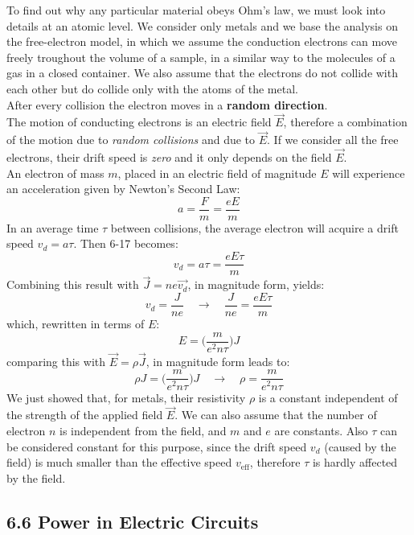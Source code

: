 \documentclass[12pt, a4paper]{article}
\begin{document}
		To find out why any particular material obeys Ohm's law, we must look into details at an atomic level. We consider only metals and we base the analysis on the free-electron model, in which we assume the conduction electrons can move freely troughout the volume of a sample, in a similar way to the molecules of a gas in a closed container. We also assume that the electrons do not collide with each other but do collide only with the atoms of the metal. \\
		After every collision the electron moves in a \textbf{random direction}. \\
		The motion of conducting electrons is an electric field $\vec{E}$, therefore a combination of the motion due to \textit{random collisions} and due to $\vec{E}$. If we consider all the free electrons, their drift speed is \textit{zero} and it only depends on the field $\vec{E}$.
		\\ 
		An electron of mass $m$, placed in an electric field of magnitude $E$ will experience an acceleration given by Newton's Second Law:
		\[
			a = \frac{F}{m} = \frac{eE}{m}
			\tag{6-17}
		\]
		In an average time $\tau$ between collisions, the average electron will acquire a drift speed $v_d = a \tau$. Then 6-17 becomes:
		\[
			v_d = a \tau = \frac{e E \tau}{m}
			\tag{6-18}			
		\]
		Combining this result with $\vec{J} = n e \vec{v_d}$, in magnitude form, yields:
		\[
			v_d = \frac{J}{n e} \quad \rightarrow \quad \frac{J}{n e} = \frac{e E \tau}{m}
			\tag{6-19}
		\]
		which, rewritten in terms of $E$:
		\[
			E = \biggl( \frac{m}{e^2 n \tau} \biggl) J
			\tag{6-20}
		\]
		comparing this with $\vec{E} = \rho \vec{J}$, in magnitude form leads to:
		\[
			\rho J = \biggl( \frac{m}{e^2 n \tau} \biggl) J \quad
			\rightarrow \quad \rho = \frac{m}{e^2 n \tau}
			\tag{6-21}
		\]
		We just showed that, for metals, their resistivity $\rho$ is a constant independent of the strength of the applied field $\vec{E}$. We can also assume that the number of electron $n$ is independent from the field, and $m$ and $e$ are constants. Also $\tau$ can be considered constant for this purpose, since the drift speed $v_d$ (caused by the field) is much smaller than the effective speed $v_{\text{eff}}$, therefore $\tau$ is hardly affected by the field. 
		
		
		
		\subsection*{6.6 Power in Electric Circuits}
		
\end{document}
